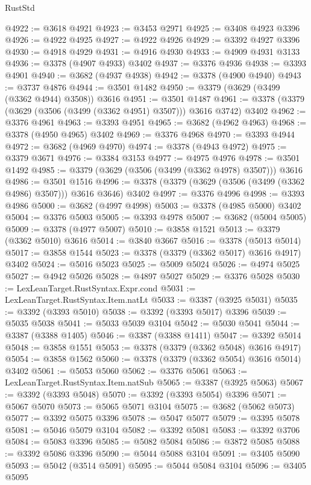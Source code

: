 \begin{lexlean}{RustStd}
\begin{coremodule}
@4922 := @3618 @4921
@4923 := @3453 @2971
@4925 := @3408 @4923 @3396
@4926 := @4922 @4925
@4927 := @4922 @4926
@4929 := @3392 @4927 @3396
@4930 := @4918 @4929
@4931 := @4916 @4930
@4933 := @4909 @4931 @3133
@4936 := @3378 (@4907 @4933) @3402
@4937 := @3376 @4936
@4938 := @3393 @4901
@4940 := @3682 (@4937 @4938)
@4942 := @3378 (@4900 @4940)
@4943 := @3737 @4876
@4944 := @3501 @1482
@4950 := @3379 (@3629 (@3499 (@3362 @4944) @3508)) @3616
@4951 := @3501 @1487
@4961 := @3378 (@3379 (@3629 (@3506 (@3499 (@3362 @4951) @3507))) @3616 @3742) @3402
@4962 := @3376 @4961
@4963 := @3393 @4951
@4965 := @3682 (@4962 @4963)
@4968 := @3378 (@4950 @4965) @3402
@4969 := @3376 @4968
@4970 := @3393 @4944
@4972 := @3682 (@4969 @4970)
@4974 := @3378 (@4943 @4972)
@4975 := @3379 @3671
@4976 := @3384 @3153
@4977 := @4975 @4976
@4978 := @3501 @1492
@4985 := @3379 (@3629 (@3506 (@3499 (@3362 @4978) @3507))) @3616
@4986 := @3501 @1516
@4996 := @3378 (@3379 (@3629 (@3506 (@3499 (@3362 @4986) @3507))) @3616 @3646) @3402
@4997 := @3376 @4996
@4998 := @3393 @4986
@5000 := @3682 (@4997 @4998)
@5003 := @3378 (@4985 @5000) @3402
@5004 := @3376 @5003
@5005 := @3393 @4978
@5007 := @3682 (@5004 @5005)
@5009 := @3378 (@4977 @5007)
@5010 := @3858 @1521
@5013 := @3379 (@3362 @5010) @3616
@5014 := @3840 @3667
@5016 := @3378 (@5013 @5014)
@5017 := @3858 @1544
@5023 := @3378 (@3379 (@3362 @5017) @3616 @4917) @3402
@5024 := @5016 @5023
@5025 := @5009 @5024
@5026 := @4974 @5025
@5027 := @4942 @5026
@5028 := @4897 @5027
@5029 := @3376 @5028
@5030 := LexLeanTarget.RustSyntax.Expr.cond
@5031 := LexLeanTarget.RustSyntax.Item.natLt
@5033 := @3387 (@3925 @5031)
@5035 := @3392 (@3393 @5010)
@5038 := @3392 (@3393 @5017) @3396
@5039 := @5035 @5038
@5041 := @5033 @5039 @3104
@5042 := @5030 @5041
@5044 := @3387 (@3388 @1405)
@5046 := @3387 (@3388 @1411)
@5047 := @3392 @5014
@5048 := @3858 @1551
@5053 := @3378 (@3379 (@3362 @5048) @3616 @4917)
@5054 := @3858 @1562
@5060 := @3378 (@3379 (@3362 @5054) @3616 @5014) @3402
@5061 := @5053 @5060
@5062 := @3376 @5061
@5063 := LexLeanTarget.RustSyntax.Item.natSub
@5065 := @3387 (@3925 @5063)
@5067 := @3392 (@3393 @5048)
@5070 := @3392 (@3393 @5054) @3396
@5071 := @5067 @5070
@5073 := @5065 @5071 @3104
@5075 := @3682 (@5062 @5073)
@5077 := @3392 @5075 @3396
@5078 := @5047 @5077
@5079 := @3395 @5078
@5081 := @5046 @5079 @3104
@5082 := @3392 @5081
@5083 := @3392 @3706
@5084 := @5083 @3396
@5085 := @5082 @5084
@5086 := @3872 @5085
@5088 := @3392 @5086 @3396
@5090 := @5044 @5088 @3104
@5091 := @3405 @5090
@5093 := @5042 (@3514 @5091)
@5095 := @5044 @5084 @3104
@5096 := @3405 @5095

\end{coremodule}
\end{lexlean}
